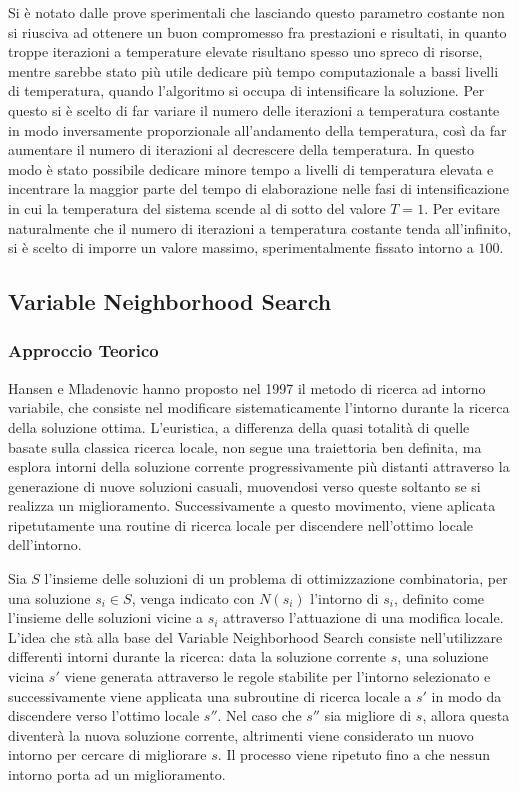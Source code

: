 \documentclass[a4paper,10pt]{article}
\begin{document}
\begin{description}
Si è notato dalle prove sperimentali che lasciando questo parametro costante non si riusciva ad ottenere un buon compromesso fra prestazioni e risultati, in quanto troppe iterazioni a temperature elevate risultano spesso uno spreco di risorse, mentre sarebbe stato più utile dedicare più tempo computazionale a bassi livelli di temperatura, quando l'algoritmo si occupa di intensificare la soluzione. Per questo si è scelto di far variare il numero delle iterazioni a temperatura costante in modo inversamente proporzionale all'andamento della temperatura, così da far aumentare il numero di iterazioni al decrescere della temperatura. In questo modo è stato possibile dedicare minore tempo a livelli di temperatura elevata e incentrare la maggior parte del tempo di elaborazione nelle fasi di intensificazione in cui la temperatura del sistema scende al di sotto del valore $T=1$. Per evitare naturalmente che il numero di iterazioni a temperatura costante tenda all'infinito, si è scelto di imporre un valore massimo, sperimentalmente fissato intorno a $100$.
\end{description}

\subsection{Variable Neighborhood Search}
\subsubsection{Approccio Teorico}
Hansen e Mladenovic hanno proposto \cite{vns} nel 1997 il metodo di ricerca ad intorno variabile, che consiste nel modificare sistematicamente l'intorno durante la ricerca della soluzione ottima. L'euristica, a differenza della quasi totalità di quelle basate sulla classica ricerca locale, non segue una traiettoria ben definita, ma esplora intorni della soluzione corrente progressivamente più distanti attraverso la generazione di nuove soluzioni casuali, muovendosi verso queste soltanto se si realizza un miglioramento. Successivamente a questo movimento, viene aplicata ripetutamente una routine di ricerca locale per discendere nell'ottimo locale dell'intorno. 

Sia $S$ l'insieme delle soluzioni di un problema di ottimizzazione combinatoria, per una soluzione $s_{i} \in S$, venga indicato con $N(s_{i})$ l'intorno di $s_{i}$, definito come l'insieme delle soluzioni vicine a $s_{i}$ attraverso l'attuazione di una modifica locale. L'idea che stà alla base del Variable Neighborhood Search consiste nell'utilizzare differenti intorni durante la ricerca: data la soluzione corrente $s$, una soluzione vicina $s'$ viene generata attraverso le regole stabilite per l'intorno selezionato e successivamente viene applicata una subroutine di ricerca locale a $s'$ in modo da discendere verso l'ottimo locale $s''$. Nel caso che $s''$  sia migliore di $s$, allora questa diventerà la nuova soluzione corrente, altrimenti viene considerato un nuovo intorno per cercare di migliorare $s$. Il processo viene ripetuto fino a che nessun intorno porta ad un miglioramento. 
\end{document}
